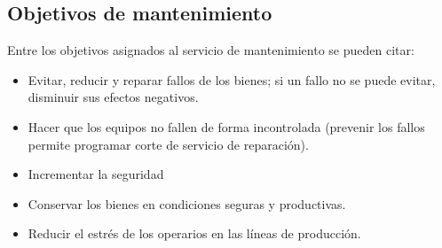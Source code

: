 \documentclass[
	12pt, %
	fleqn, %
	a4paper, %
]{LegrandOrangeBook}
\begin{document}
\subsection{Objetivos de mantenimiento}
Entre los objetivos asignados al servicio de mantenimiento se pueden citar:
\begin{itemize}
\item Evitar, reducir y reparar fallos de los bienes; si un fallo no se puede evitar, disminuir sus efectos negativos.
\item Hacer que los equipos no fallen de forma incontrolada (prevenir los fallos permite programar corte de servicio de reparación).
\item Incrementar la seguridad
\item Conservar los bienes en condiciones seguras y productivas.
\item Reducir el estrés de los operarios en las líneas de producción.
\end{itemize}
\end{document}
